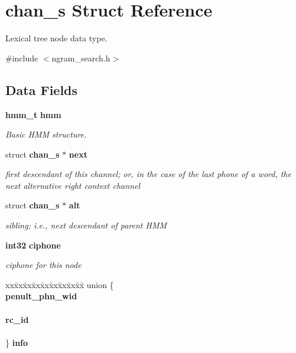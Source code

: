 \section{chan\-\_\-s \-Struct \-Reference}
\label{structchan__s}


\-Lexical tree node data type.  




{\ttfamily \#include $<$ngram\-\_\-search.\-h$>$}

\subsection*{\-Data \-Fields}
\begin{DoxyCompactItemize}
\item 
{\bf hmm\-\_\-t} {\bf hmm}
\begin{DoxyCompactList}\small\item\em \-Basic \-H\-M\-M structure. \end{DoxyCompactList}\item 
struct {\bf chan\-\_\-s} $\ast$ {\bf next}\label{structchan__s_a260b68eff64150d0ae9ce4db7feb1300}

\begin{DoxyCompactList}\small\item\em first descendant of this channel; or, in the case of the last phone of a word, the next alternative right context channel \end{DoxyCompactList}\item 
struct {\bf chan\-\_\-s} $\ast$ {\bf alt}\label{structchan__s_a52e85d037ca3a8b21ff1eed1d469ca15}

\begin{DoxyCompactList}\small\item\em sibling; i.\-e., next descendant of parent \-H\-M\-M \end{DoxyCompactList}\item 
{\bf int32} {\bf ciphone}\label{structchan__s_a33da51d8524073abc792519d0738ca0b}

\begin{DoxyCompactList}\small\item\em ciphone for this node \end{DoxyCompactList}\item 
\begin{tabbing}
xx\=xx\=xx\=xx\=xx\=xx\=xx\=xx\=xx\=\kill
union \{\\
 {\bf penult\_phn\_wid}\\
\>\\
 {\bf rc\_id}\\
\>\\
\} {\bfseries info}\label{structchan__s_a8c60fed876760c48952eb19e8dae41a8}
\\

\end{tabbing}\end{DoxyCompactItemize}


